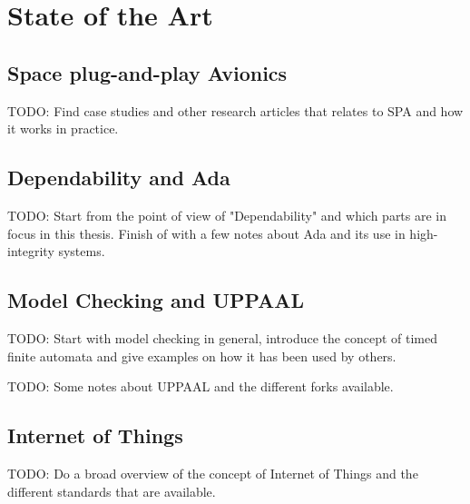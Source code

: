 \chapter{State of the Art} \label{ch:state_of_the_art}

\section{Space plug-and-play Avionics}
TODO: Find case studies and other research articles that relates to SPA and how
it works in practice.

\section{Dependability and Ada}
TODO: Start from the point of view of "Dependability" and which parts are in
focus in this thesis. Finish of with a few notes about Ada and its use in
high-integrity systems.

\section{Model Checking and UPPAAL}
TODO: Start with model checking in general, introduce the concept of timed
finite automata and give examples on how it has been used by others.

TODO: Some notes about UPPAAL and the different forks available.

\section{Internet of Things}
TODO: Do a broad overview of the concept of Internet of Things and the
different standards that are available.
